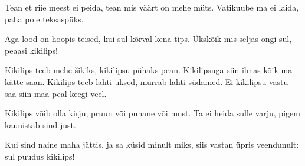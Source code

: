 Tean et riie meest ei peida,
tean mis v\"a\"art on mehe m\"uts.
Vatikuube ma ei laida,
paha pole teksasp\"uks.

Aga lood on hoopis teised,
kui sul k\~orval kena tips.
\"Uksk\~oik mis seljas ongi sul,
peaasi kikilips!

Kikilips teeb mehe \v{s}ikiks,
kikilipsu p\"uhaks pean.
Kikilipsuga siin ilmas
k\~oik ma k\"atte saan.
Kikilips teeb lahti uksed,
murrab lahti s\"udamed.
Ei kikilipsu vastu saa
siin maa peal keegi veel.

Kikilips v\~oib olla kirju,
pruun v\~oi punane v\~oi must.
Ta ei heida sulle varju,
pigem kaunistab sind just.

Kui sind naine maha j\"attis,
ja sa k\"usid minult miks,
siis vastan \"upris veendunult:
sul puudus kikilips!

